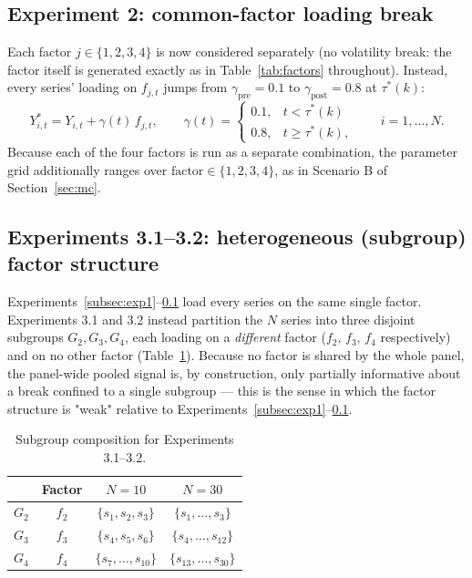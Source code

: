 \documentclass[12pt]{article}
\begin{document}
\subsection{Experiment 2: common-factor loading break}
\label{subsec:exp2}

Each factor $j\in\{1,2,3,4\}$ is now considered separately (no volatility
break: the factor itself is generated exactly as in Table~\ref{tab:factors}
throughout). Instead, every series' loading on $f_{j,t}$ jumps from
$\gamma_{\text{pre}}=0.1$ to $\gamma_{\text{post}}=0.8$ at $\tau^*(k)$:
\begin{equation}
Y^*_{i,t} = Y_{i,t} + \gamma(t)\, f_{j,t}, \qquad
\gamma(t) = \begin{cases} 0.1, & t < \tau^*(k) \\ 0.8, & t \ge \tau^*(k), \end{cases}
\qquad i=1,\dots,N.
\label{eq:exp2load}
\end{equation}
Because each of the four factors is run as a separate combination, the
parameter grid additionally ranges over $\mathrm{factor}\in\{1,2,3,4\}$, as
in Scenario B of Section~\ref{sec:mc}.

\subsection{Experiments 3.1--3.2: heterogeneous (subgroup) factor structure}
\label{subsec:exp3}

Experiments~\ref{subsec:exp1}--\ref{subsec:exp2} load every series on the
same single factor. Experiments 3.1 and 3.2 instead partition the $N$
series into three disjoint subgroups $G_2, G_3, G_4$, each loading on a
\emph{different} factor ($f_2$, $f_3$, $f_4$ respectively) and on no other
factor (Table~\ref{tab:exp3groups}). Because no factor is shared by the
whole panel, the panel-wide pooled signal is, by construction, only
partially informative about a break confined to a single subgroup --- this
is the sense in which the factor structure is "weak" relative to
Experiments~\ref{subsec:exp1}--\ref{subsec:exp2}.

\begin{table}[h]
\centering
\caption{Subgroup composition for Experiments 3.1--3.2.}
\label{tab:exp3groups}
\begin{tabular}{cccc}
\toprule
& Factor & $N=10$ & $N=30$ \\
\midrule
$G_2$ & $f_2$ & $\{s_1,s_2,s_3\}$ & $\{s_1,\dots,s_3\}$ \\
$G_3$ & $f_3$ & $\{s_4,s_5,s_6\}$ & $\{s_4,\dots,s_{12}\}$ \\
$G_4$ & $f_4$ & $\{s_7,\dots,s_{10}\}$ & $\{s_{13},\dots,s_{30}\}$ \\
\bottomrule
\end{tabular}
\end{table}
\end{document}
